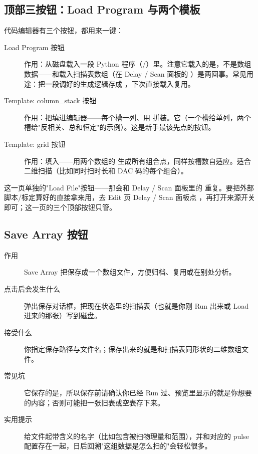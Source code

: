 \documentclass[11pt,oneside,openany]{book}
\begin{document}
\subsection{顶部三按钮：Load Program 与两个模板}

代码编辑器有三个按钮，都用来一键：

\begin{description}
\item[Load Program 按钮] 作用：从磁盘载入一段 Python 程序（/）里。注意它载入的是，不是数组数据——和载入扫描表数组（在 Delay / Scan 面板的 ）是两回事。常见用途：把一段调好的生成逻辑存成 ，下次直接载入复用。
\item[Template: column\_stack 按钮] 作用：把填进编辑器——每个槽一列、用  拼装。它（一个槽给单列，两个槽给"反相关、总和恒定"的示例）。这是新手最该先点的按钮。
\item[Template: grid 按钮] 作用：填入——用两个数组的  生成所有组合点，同样按槽数自适应。适合二维扫描（比如同时扫时长和 DAC 码的每个组合）。
\end{description}

\begin{notebox}[载入现成数组在哪]
这一页单独的"Load File"按钮——那会和 Delay / Scan 面板里的  重复。要把外部脚本/标定算好的直接拿来用，去 Edit 页 Delay / Scan 面板点 ，再打开来源开关即可；这一页的三个顶部按钮只管。
\end{notebox}

\subsection{Save Array 按钮}

\begin{description}
\item[作用] Save Array 把保存成一个数组文件，方便归档、复用或在别处分析。
\item[点击后会发生什么] 弹出保存对话框，把现在状态里的扫描表（也就是你刚 Run 出来或 Load 进来的那张）写到磁盘。
\item[接受什么] 你指定保存路径与文件名；保存出来的就是和扫描表同形状的二维数组文件。
\item[常见坑] 它保存的是，所以保存前请确认你已经 Run 过、预览里显示的就是你想要的内容；否则可能把一张旧表或空表存下来。
\item[实用提示] 给文件起带含义的名字（比如包含被扫物理量和范围），并和对应的 pulse 配置存在一起，日后回溯"这组数据是怎么扫的"会轻松很多。
\end{description}
\end{document}
